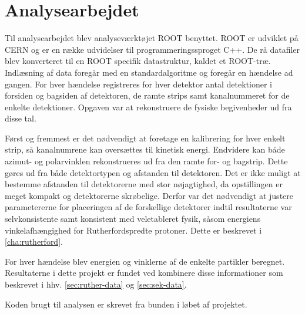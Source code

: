 \section{Analysearbejdet}
\label{sec:analyse}

Til analysearbejdet blev analyseværktøjet ROOT benyttet. ROOT er udviklet på CERN og er en række
udvidelser til programmeringssproget C++. De rå datafiler blev konverteret til en ROOT specifik
datastruktur, kaldet et ROOT-træ. Indlæsning af data foregår med en standardalgoritme og foregår en
hændelse ad gangen. For hver hændelse registreres for hver detektor antal detektioner i
forsiden og bagsiden af detektoren, de ramte strips samt kanalnummeret for de enkelte
detektioner. Opgaven var  at rekonstruere de fysiske begivenheder ud fra disse tal.

Først og fremmest er det nødvendigt at foretage en kalibrering for hver enkelt strip, så
kanalnumrene kan oversættes til kinetisk energi. Endvidere kan både azimut- og polarvinklen
rekonstrueres ud fra den ramte for- og bagstrip. Dette gøres ud fra både detektortypen og afstanden
til detektoren. Det er ikke muligt at bestemme afstanden til detektorerne med stor nøjagtighed, da
opstillingen er meget kompakt og detektorerne skrøbelige. Derfor var det nødvendigt at justere
parametererne for placeringen af de forskellige detektorer indtil resultaterne var selvkonsistente
samt konsistent med veletableret fysik, såsom energiens vinkelafhængighed for Rutherfordspredte
protoner. Dette er beskrevet i \cref{cha:rutherford}.

For hver hændelse blev energien og vinklerne af de enkelte partikler beregnet. Resultaterne i dette
projekt er fundet ved kombinere disse informationer som beskrevet i hhv. \cref{sec:ruther-data} og
\ref{sec:sek-data}.

Koden brugt til analysen er skrevet fra bunden i løbet af projektet.
